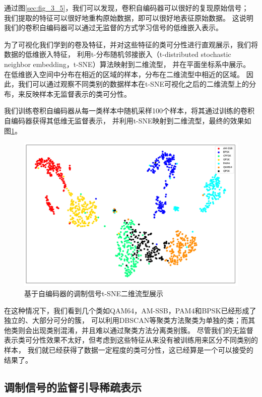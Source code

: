 通过图\ref{sec:fig_3_5}，我们可以发现，卷积自编码器可以很好的复现原始信号；
我们提取的特征可以很好地重构原始数据，即可以很好地表征原始数据。
这说明我们的卷积自编码器可以通过无监督的方式学习信号的低维嵌入表示。\par

为了可视化我们学到的卷及特征，并对这些特征的类可分性进行直观展示，我们将数据的低维嵌入特征，
利用t-分布随机邻接嵌入（t-distributed stochastic neighbor embedding，t-SNE）算法映射到二维流型，
并在平面坐标系中展示。
在低维嵌入空间中分布在相近的区域的样本，分布在二维流型中相近的区域。
因此，我们可以通过观察不同类别的数据样本在t-SNE可视化之后的二维流型上的分布，来反映样本无监督表示的类可分性。\par

我们训练卷积自编码器从每一类样本中随机采样100个样本，将其通过训练的卷积自编码器获得其低维无监督表示，
并利用t-SNE映射到二维流型，最终的效果如图\ref{sec:fig_3_6}。

\begin{figure}[!h]
	\centering
	\includegraphics[scale=0.4]{figures/chapter_3/fig_3_6}
	\caption{基于自编码器的调制信号t-SNE二维流型展示}	\label{sec:fig_3_6}
\end{figure}

在这种情况下，我们看到几个类如QAM64，AM-SSB，PAM4和BPSK已经形成了独立的、大部分可分的簇，
可以利用DBSCAN等聚类方法聚类为单独的类；而其他类则会出现类别混淆，并且难以通过聚类方法分离类别簇。 
尽管我们的无监督表示类可分性效果不太好，但考虑到这些特征从来没有被训练用来区分不同类别的样本，
我们就已经获得了数据一定程度的类可分性，这已经算是一个可以接受的结果了。 \par 

\subsection{调制信号的监督引导稀疏表示}

